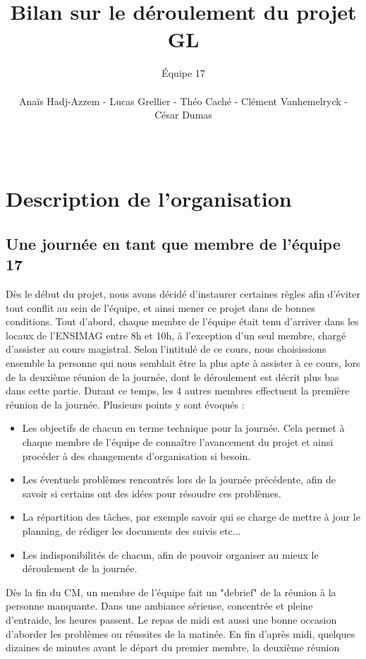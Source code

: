 \documentclass{article}
\title{\vspace{\fill} Bilan sur le déroulement du projet GL \vspace{\fill}}
\author{Équipe 17 \\\\ Anaïs Hadj-Azzem - Lucas Grellier - Théo Caché - Clément Vanhemelryck - César Dumas}
\date{\\}
\begin{document}
\maketitle
\thispagestyle{empty}
\setcounter{page}{0}
\newpage

\tableofcontents
\thispagestyle{empty}
\setcounter{page}{0}
\newpage

\section{Description de l'organisation}
\subsection{Une journée en tant que membre de l'équipe 17}
Dès le début du projet, nous avons décidé d'instaurer certaines règles afin d'éviter tout conflit au sein de l'équipe, et ainsi mener ce projet dans de bonnes conditions. \newline
Tout d'abord, chaque membre de l'équipe était tenu d'arriver dans les locaux de l'ENSIMAG entre 8h et 10h, à l'exception d'un seul membre, chargé d'assister au cours magistral.
Selon l'intitulé de ce cours, nous choisissions ensemble la personne qui nous semblait être la plus apte à assister à ce cours, lors de la deuxième réunion de la journée,
dont le déroulement est décrit plus bas dans cette partie. \newline
Durant ce temps, les 4 autres membres effectuent la première réunion de la journée. Plusieurs points y sont évoqués :
\begin{itemize}
\item Les objectifs de chacun en terme technique pour la journée. Cela permet à chaque membre de l'équipe de connaître l'avancement du projet et ainsi procéder à des changements d'organisation si besoin.
\item Les éventuels problèmes rencontrés lors de la journée précédente, afin de savoir si certains ont des idées pour résoudre ces problèmes.
\item La répartition des tâches, par exemple savoir qui se charge de mettre à jour le planning, de rédiger les documents des suivis etc...
\item Les indisponibilités de chacun, afin de pouvoir organiser au mieux le déroulement de la journée.
\end{itemize}
Dès la fin du CM, un membre de l'équipe fait un "debrief" de la réunion à la personne manquante. \newline
Dans une ambiance sérieuse, concentrée et pleine d'entraide, les heures passent. Le repas de midi est aussi une bonne occasion d'aborder les problèmes ou réussites de la matinée. En fin d'après midi, quelques dizaines de minutes avant le départ du premier membre, la deuxième réunion
\end{document}
